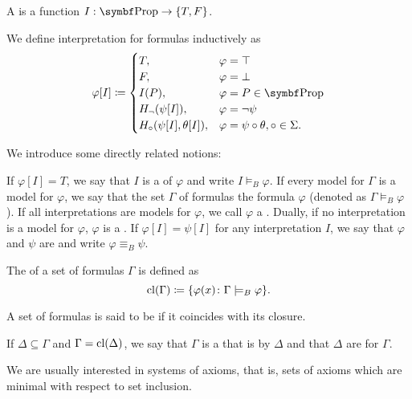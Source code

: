 \begin{Definition}\label{def:propositional_interpretation}
  A  is a function \( I: \Bold{Prop} \to \{ T, F \} \).

  We define interpretation for formulas inductively as
  \begin{align*}
    \varphi[I] \coloneqq \begin{cases}
      T,                           &\varphi = \top \\
      F,                           &\varphi = \bot \\
      I(P),                        &\varphi = P \in \Bold{Prop} \\
      H_\neg(\psi[I]),             &\varphi = \neg \psi         \\
      H_\circ(\psi[I], \theta[I]), &\varphi = \psi \circ \theta, \circ \in \Sigma.
    \end{cases}
  \end{align*}

  We introduce some directly related notions:
  \begin{DefEnum}
     If \( \varphi[I] = T \), we say that \( I \) is a  of \( \varphi \) and write \( I \models_B \varphi \).
     If every model for \( \Gamma \) is a model for \( \varphi \), we say that the set \( \Gamma \) of formulas  the formula \( \varphi \) (denoted as \( \Gamma \models_B \varphi \)).
     If all interpretations are models for \( \varphi \), we call \( \varphi \) a .
     Dually, if no interpretation is a model for \( \varphi \), \( \varphi \) is a .
     If \( \varphi[I] = \psi[I] \) for any interpretation \( I \), we say that \( \varphi \) and \( \psi \) are  and write \( \varphi \equiv_B \psi \).
  \end{DefEnum}
\end{Definition}

\begin{Definition}\label{def:propositional_theory}\cite[definition 15.1]{OpenLogic20201202}
  The  of a set of formulas \( \Gamma \) is defined as
  \begin{equation*}
    \operatorname{cl}(\Gamma) \coloneqq \{ \varphi(x) \colon \Gamma \models_B \varphi \}.
  \end{equation*}

  A set of formulas is said to be  if it coincides with its closure.

  If \( \Delta \subseteq \Gamma \) and \( \Gamma = \operatorname{cl}(\Delta) \), we say that \( \Gamma \) is a  that is  by \( \Delta \) and that \( \Delta \) are  for \( \Gamma \).

  We are usually interested in  systems of axioms, that is, sets of axioms which are minimal with respect to set inclusion.
\end{Definition}

